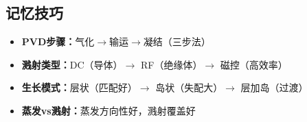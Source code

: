 \documentclass[UTF8,12pt,a4paper]{ctexart}
\begin{document}
\subsection{记忆技巧}

\begin{itemize}
    \item \textbf{PVD步骤：}气化$\rightarrow$输运$\rightarrow$凝结（三步法）
    \item \textbf{溅射类型：}DC（导体）$\rightarrow$ RF（绝缘体）$\rightarrow$ 磁控（高效率）
    \item \textbf{生长模式：}层状（匹配好）$\rightarrow$ 岛状（失配大）$\rightarrow$ 层加岛（过渡）
    \item \textbf{蒸发vs溅射：}蒸发方向性好，溅射覆盖好
\end{itemize}
\end{document}
